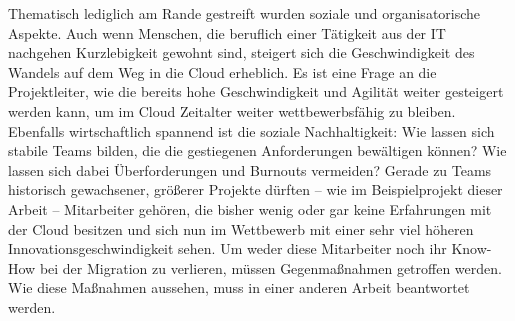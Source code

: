 Thematisch lediglich am Rande gestreift wurden soziale und organisatorische 
Aspekte. Auch wenn Menschen, die beruflich einer Tätigkeit aus der IT nachgehen 
Kurzlebigkeit gewohnt sind, steigert sich die Geschwindigkeit des Wandels auf 
dem Weg in die Cloud erheblich. Es ist eine Frage an die Projektleiter, wie die 
bereits hohe Geschwindigkeit und Agilität weiter gesteigert werden kann, um im 
Cloud Zeitalter weiter wettbewerbsfähig zu bleiben. Ebenfalls wirtschaftlich 
spannend ist die soziale Nachhaltigkeit: Wie lassen sich stabile Teams bilden, 
die die gestiegenen Anforderungen bewältigen können? Wie lassen sich dabei 
Überforderungen und Burnouts vermeiden? Gerade zu Teams historisch gewachsener, 
größerer Projekte dürften -- wie im Beispielprojekt dieser Arbeit -- 
Mitarbeiter gehören, die bisher wenig oder gar keine Erfahrungen mit der 
Cloud besitzen und sich nun im Wettbewerb mit einer sehr viel höheren 
Innovationsgeschwindigkeit sehen. Um weder diese Mitarbeiter noch ihr Know-How 
bei der Migration zu verlieren, müssen Gegenmaßnahmen getroffen 
werden. Wie diese Maßnahmen aussehen, muss in einer anderen Arbeit beantwortet 
werden.

